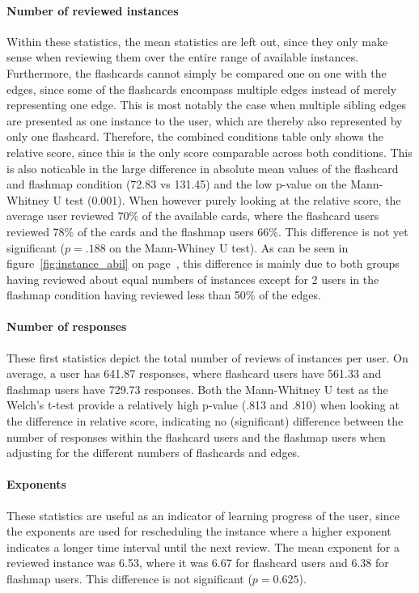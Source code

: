 \paragraph{Number of reviewed instances} Within these statistics, the mean statistics are left out, since they only make sense when reviewing them over the entire range of available instances. Furthermore, the flashcards cannot simply be compared one on one with the edges, since some of the flashcards encompass multiple edges instead of merely representing one edge. This is most notably the case when multiple sibling edges are presented as one instance to the user, which are thereby also represented by only one flashcard. Therefore, the combined conditions table only shows the relative score, since this is the only score comparable across both conditions. This is also noticable in the large difference in absolute mean values of the flashcard and flashmap condition (72.83 vs 131.45) and the low p-value on the Mann-Whitney U test (0.001). When however purely looking at the relative score, the average user reviewed 70\% of the available cards, where the flashcard users reviewed 78\% of the cards and the flashmap users 66\%. This difference is not yet significant ($p=.188$ on the Mann-Whiney U test). As can be seen in figure~\ref{fig:instance_abil} on page~\pageref{fig:instance_abil}, this difference is mainly due to both groups having reviewed about equal numbers of instances except for 2 users in the flashmap condition having reviewed less than 50\% of the edges.

\paragraph{Number of responses} These first statistics depict the total number of reviews of instances per user. On average, a user has 641.87 responses, where flashcard users have 561.33 and flashmap users have 729.73 responses. Both the Mann-Whitney U test as the Welch's t-test provide a relatively high p-value (.813 and .810) when looking at the difference in relative score, indicating no (significant) difference between the number of responses within the flashcard users and the flashmap users when adjusting for the different numbers of flashcards and edges.

\paragraph{Exponents} These statistics are useful as an indicator of learning progress of the user, since the exponents are used for rescheduling the instance where a higher exponent indicates a longer time interval until the next review. The mean exponent for a reviewed instance was 6.53, where it was 6.67 for flashcard users and 6.38 for flashmap users. This difference is not significant ($p=0.625$).

